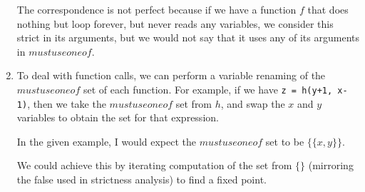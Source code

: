 \begin{enumerate}[label=(\alph*)]
    The correspondence is not perfect because if we have a function $f$ that does nothing but loop forever, but never reads any variables, we consider this strict in its arguments, but we would not say that it uses any of its arguments in $mustuseoneof$.


  \item
    To deal with function calls, we can perform a variable renaming of the $mustuseoneof$ set of each function. For example, if we have \texttt{z = h(y+1, x-1)}, then we take the $mustuseoneof$ set from $h$, and swap the $x$ and $y$ variables to obtain the set for that expression.

    In the given example, I would expect the $mustuseoneof$ set to be $\{\{x,y\}\}$.

    We could achieve this by iterating computation of the set from $\{\}$ (mirroring the false used in strictness analysis) to find a fixed point.






        
\end{enumerate}

